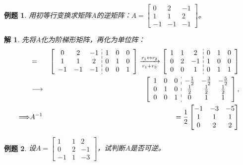 \documentclass[a4paper]{book}
\newtheorem{eg}{例题}[chapter]
\newtheorem*{solution}{解}
\begin{document}
\begin{eg}
用初等行变换求矩阵$A$的逆矩阵：$A = \begin{bmatrix} 0 & 2 & -1 \\ 1 & 1 & 2 \\ -1 & -1 & -1 \end{bmatrix}$。
\end{eg}

\begin{solution}
先将$A$化为阶梯形矩阵，再化为单位阵：
\begin{eqnarray*}
[A,I] & = &
  \setlength{\dashlinegap}{2pt}
  \left[ \begin{array}{ccc:ccc}
    0 & 2 & -1 & 1 & 0 & 0 \\ 1 & 1 & 2 & 0 & 1 & 0 \\ -1 & -1 & -1 & 0 & 0 & 1
  \end{array} \right] \xrightarrow[r_1+r_3]{r_1\leftrightarrow r_2}
  \left[ \begin{array}{ccc:ccc}
     1 & 1 & 2 & 0 & 1 & 0 \\ 0 & 2 & -1 & 1 & 0 & 0 \\ 0 & 0 & 1 & 0 & 1 & 1
  \end{array} \right] \\
  & \longrightarrow & \left[ \begin{array}{ccc:ccc}
     1 & 0 & 0 & -\frac12 & -\frac32 & -\frac52 \\ 0 & 1 & 0 & \frac12 & \frac12 & \frac12 \\ 0 & 0 & 1 & 0 & 1 & 1 \end{array} \right], \\
\Longrightarrow & A^{-1} & = \frac12\begin{bmatrix} -1 & -3 & -5 \\ 1 & 1 & 1 \\ 0 & 2 & 2 \end{bmatrix}
\end{eqnarray*}
\end{solution}

\begin{eg}
设$A = \begin{bmatrix} 1 & 1 & 2 \\ 0 & 2 & -1 \\ -1 & 1 & -3 \end{bmatrix}$，试判断$A$是否可逆。
\end{eg}
\end{document}
